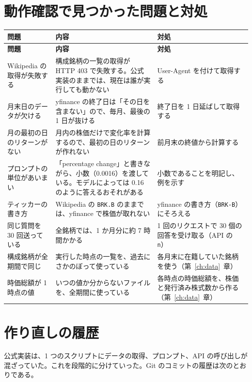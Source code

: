\documentclass[xelatex,ja=standard,jafont=hiragino-pron,a4paper,10pt]{bxjsreport}
\newcommand{\code}[1]{\texttt{#1}}
\newcommand{\chapref}[1]{第~\ref{#1}~章}
\begin{document}
\section{動作確認で見つかった問題と対処}

\begin{longtable}{p{4.00cm}p{5.40cm}p{5.00cm}}
\toprule
\textbf{問題} & \textbf{内容} & \textbf{対処} \\
\midrule
\endfirsthead
\toprule
\textbf{問題} & \textbf{内容} & \textbf{対処} \\
\midrule
\endhead
\bottomrule
\endfoot
Wikipedia の取得が失敗する & 構成銘柄の一覧の取得が HTTP 403 で失敗する。公式実装のままでは、現在は誰が実行しても動かない & User-Agent を付けて取得する \\
月末日のデータが欠ける & yfinance の終了日は「その日を含まない」ので、毎月、最後の 1 日が抜ける & 終了日を 1 日延ばして取得する \\
月の最初の日のリターンがない & 月内の株価だけで変化率を計算するので、最初の日のリターンが作れない & 前月末の終値から計算する \\
プロンプトの単位があいまい & 「percentage change」と書きながら、小数（0.0016）を渡している。モデルによっては 0.16 のように答えるおそれがある & 小数であることを明記し、例を示す \\
ティッカーの書き方 & Wikipedia の \code{BRK.B} のままでは、yfinance で株価が取れない & yfinance の書き方（\code{BRK-B}）にそろえる \\
同じ質問を 30 回送っている & 全銘柄では、1 か月分に約 7 時間かかる & 1 回のリクエストで 30 個の回答を受け取る（API の \code{n}） \\
構成銘柄が全期間で同じ & 実行した時点の一覧を、過去にさかのぼって使っている & 各月末に在籍していた銘柄を使う（\chapref{ch:data}） \\
時価総額が 1 時点の値 & いつの値か分からないファイルを、全期間に使っている & 各時点の時価総額を、株価と発行済み株式数から作る（\chapref{ch:data}） \\
\end{longtable}

\section{作り直しの履歴}

公式実装は、1 つのスクリプトにデータの取得、プロンプト、API の呼び出しが混ざっていた。これを段階的に分けていった。Git のコミットの履歴は次のとおりである。
\end{document}
